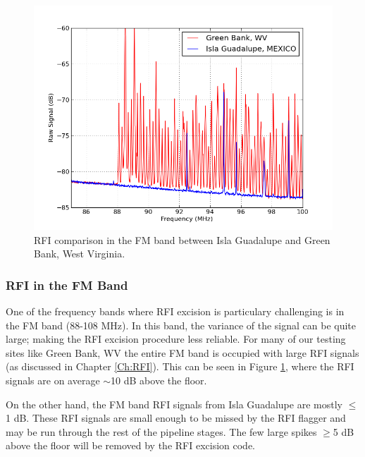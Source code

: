 \begin{figure}[htb]
\begin{center}
\includegraphics[width=0.9\linewidth]{Data_analysis/figures/FM_band_comp.png}
\caption{RFI comparison in the FM band between Isla Guadalupe and Green Bank, West Virginia. }
\label{Fig:FM_band}
\end{center}
\end{figure}

\subsubsection{RFI in the FM Band}

One of the frequency bands where RFI excision is particulary challenging is in the FM band (88-108 MHz). In this band, the variance of the signal can be quite large; making the RFI excision procedure less reliable. For many of our testing sites like Green Bank, WV the entire FM band is occupied with large RFI signals (as discussed in Chapter \ref{Ch:RFI}). This can be seen in Figure \ref{Fig:FM_band}, where the RFI signals are on average $\sim$10 dB above the floor. 

On the other hand, the FM band RFI signals from Isla Guadalupe are mostly $\leq$1 dB. These RFI signals are small enough to be missed by the RFI flagger and may be run through the rest of the pipeline stages. The few large spikes $\geq$5 dB above the floor will be removed by the RFI excision code. 

